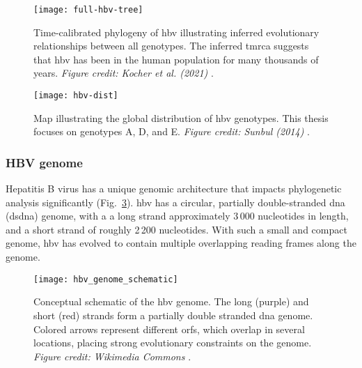 \begin{figure}[ht]
  \centering
  \texttt{[image: full-hbv-tree]}
  \caption[Phylogeny of all HBV genotypes]{Time-calibrated phylogeny of \gls{hbv} illustrating inferred evolutionary relationships between all genotypes. The inferred \gls{tmrca} suggests that \gls{hbv} has been in the human population for many thousands of years. \textit{Figure credit: Kocher et al. (2021)} \citep{kocher2021ten}.
  }
  \label{fig:hbvFullTree}
\end{figure}

\begin{figure}[ht]
  \centering
  \texttt{[image: hbv-dist]}
  \caption[Global distribution of hepatitis B virus]{Map illustrating the global distribution of \gls{hbv} genotypes. This thesis focuses on genotypes A, D, and E.
  \textit{Figure credit: Sunbul (2014)} \citep{sunbul2014hepatitis}.
  }
  \label{fig:hbvDist}
\end{figure}

\subsubsection{HBV genome}
Hepatitis B virus has a unique genomic architecture that impacts phylogenetic analysis significantly (Fig.~\ref{fig:hbvGenome}).
\gls{hbv} has a circular, partially double-stranded \gls{dna} (ds\gls{dna}) genome, with a a long strand approximately 3\,000 nucleotides in length, and a short strand of roughly 2\,200 nucleotides.
With such a small and compact genome, \gls{hbv} has evolved to contain multiple overlapping reading frames along the genome.

\begin{figure}[ht]
  \centering
  \texttt{[image: hbv\_genome\_schematic]}
  \caption[Schematic of the hepatitis B virus genome]{Conceptual schematic of the \gls{hbv} genome. The long (purple) and short (red) strands form a partially double stranded \gls{dna} genome. Colored arrows represent different \gls{orf}s, which overlap in several locations, placing strong evolutionary constraints on the genome. \textit{Figure credit: Wikimedia Commons} \citep{commons2016file}.
  }
  \label{fig:hbvGenome}
\end{figure}

